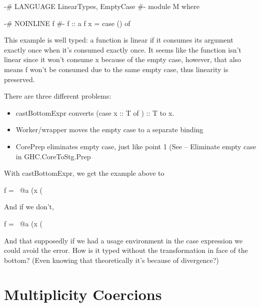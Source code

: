 \documentclass[a4paper, draft]{article}
\begin{document}
\begin{code}
{-# LANGUAGE LinearTypes, EmptyCase #-}
module M where

{-# NOINLINE f #-}
f :: a %
f x = case () of {}
\end{code}

This example is well typed: a function is linear if it consumes its argument
exactly once when it's consumed exactly once. It seems like the function isn't
linear since it won't consume x because of the empty case, however, that also
means f won't be consumed due to the same empty case, thus linearity is
preserved.


There are three different problems:

\begin{itemize}
\item castBottomExpr converts (case x :: T of {}) :: T to x.
\item Worker/wrapper moves the empty case to a separate binding
\item CorePrep eliminates empty case, just like point 1 (See -- Eliminate empty
    case in GHC.CoreToStg.Prep
\end{itemize}

With castBottomExpr, we get the example above to
\begin{code}
    f = \ @a (x (%
\end{code}
And if we don't, 
\begin{code}
    f = \ @a (x (%
\end{code}
And that supposedly if we had a usage environment in the case expression we
could avoid the error. How is it typed without the transformation in face
of the bottom? (Even knowing that theoretically it's because of divergence?)



\section{Multiplicity Coercions}
\end{document}
